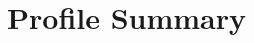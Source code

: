 \documentclass[letterpaper]{twentysecondcv} %
\begin{document}




%
%
%

\section{Profile Summary}\newline
\end{document}
